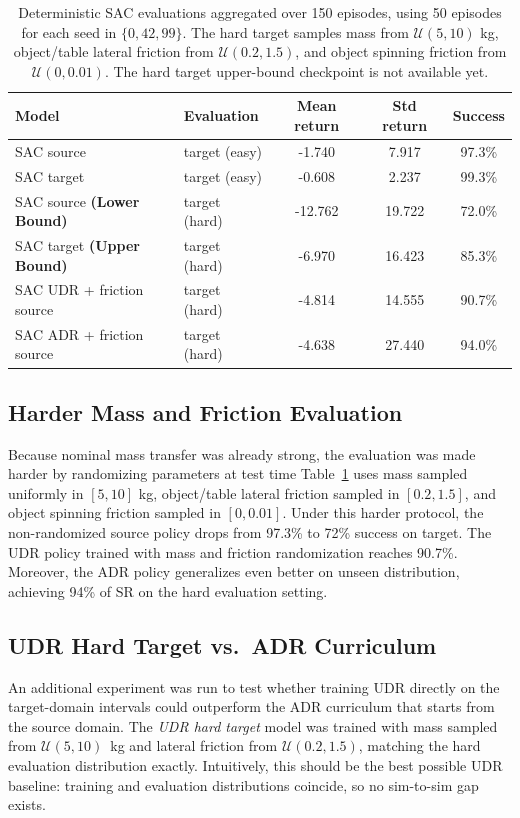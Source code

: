 \begin{table}[t]
\centering
\small
\begin{tabular}{llccc}
\toprule
Model & Evaluation & Mean return & Std return & Success \\
\midrule
SAC source  & target (easy) & -1.740 & 7.917 & 97.3\%\\
SAC target  & target (easy) & -0.608 & 2.237 & 99.3\% \\
\midrule
SAC source \textbf{(Lower Bound)} & target (hard) & -12.762 & 19.722 & 72.0\% \\
SAC target \textbf{(Upper Bound)} & target (hard) & -6.970 & 16.423 & 85.3\% \\
SAC UDR + friction source & target (hard) & -4.814 & 14.555 & 90.7\% \\
SAC ADR + friction source & target (hard) & -4.638 & 27.440 & 94.0\% \\
\bottomrule
\end{tabular}
\caption{Deterministic SAC evaluations aggregated over 150 episodes, using 50 episodes for each seed in $\{0,42,99\}$. The hard target samples mass from $\mathcal{U}(5,10)$ kg, object/table lateral friction from $\mathcal{U}(0.2,1.5)$, and object spinning friction from $\mathcal{U}(0,0.01)$. The hard target upper-bound checkpoint is not available yet.}
\label{tab:nominal-eval}
\end{table}

\subsection{Harder Mass and Friction Evaluation}
Because nominal mass transfer was already strong, the evaluation was made harder by randomizing parameters at test time
Table~\ref{tab:nominal-eval} uses mass sampled uniformly in $[5,10]$ kg, object/table lateral friction sampled in $[0.2,1.5]$, and object spinning friction sampled in $[0,0.01]$. Under this harder protocol, the non-randomized source policy drops from 97.3\% to 72\% success on target. The UDR policy trained with mass and friction randomization reaches 90.7\%.
Moreover, the ADR policy generalizes even better on unseen distribution, achieving 94\% of SR on the hard evaluation setting.


\subsection{UDR Hard Target vs.\ ADR Curriculum}

An additional experiment was run to test whether training UDR directly on the target-domain intervals could outperform the ADR curriculum that starts from the source domain.
The \emph{UDR hard target} model was trained with mass sampled from $\mathcal{U}(5,10)$~kg and lateral friction from $\mathcal{U}(0.2,1.5)$, matching the hard evaluation distribution exactly.
Intuitively, this should be the best possible UDR baseline: training and evaluation distributions coincide, so no sim-to-sim gap exists.

